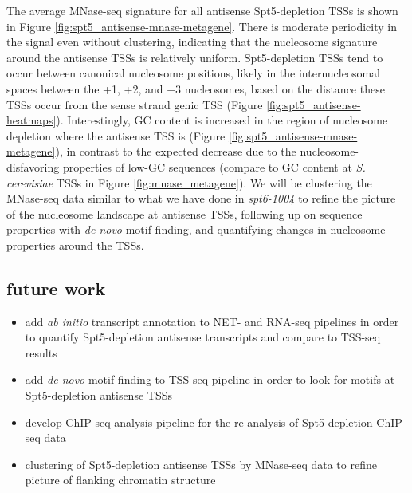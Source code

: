 \documentclass[9pt, letterpaper]{article}
\begin{document}

The average MNase-seq signature for all antisense Spt5-depletion TSSs is shown in Figure \ref{fig:spt5_antisense-mnase-metagene}. There is moderate periodicity in the signal even without clustering, indicating that the nucleosome signature around the antisense TSSs is relatively uniform. Spt5-depletion TSSs tend to occur between canonical nucleosome positions, likely in the internucleosomal spaces between the +1, +2, and +3 nucleosomes, based on the distance these TSSs occur from the sense strand genic TSS (Figure \ref{fig:spt5_antisense-heatmaps}). Interestingly, GC content is increased in the region of nucleosome depletion where the antisense TSS is (Figure \ref{fig:spt5_antisense-mnase-metagene}), in contrast to the expected decrease due to the nucleosome-disfavoring properties of low-GC sequences (compare to GC content at \textit{S. cerevisiae} TSSs in Figure \ref{fig:mnase_metagene}). We will be clustering the MNase-seq data similar to what we have done in \textit{spt6-1004} to refine the picture of the nucleosome landscape at antisense TSSs, following up on sequence properties with \textit{de novo} motif finding, and quantifying changes in nucleosome properties around the TSSs.

\subsection{future work}

\begin{itemize}[nosep]
    \item add \textit{ab initio} transcript annotation to NET- and RNA-seq pipelines in order to quantify Spt5-depletion antisense transcripts and compare to TSS-seq results
    \item add \textit{de novo} motif finding to TSS-seq pipeline in order to look for motifs at Spt5-depletion antisense TSSs
    \item develop ChIP-seq analysis pipeline for the re-analysis of Spt5-depletion ChIP-seq data
    \item clustering of Spt5-depletion antisense TSSs by MNase-seq data to refine picture of flanking chromatin structure
\end{itemize}

\newpage
{}

\end{document}
